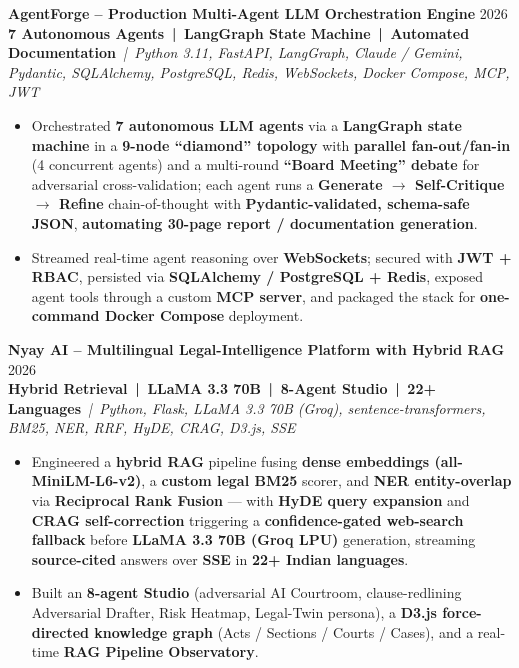\documentclass[a4paper,10pt]{article}
\newcommand{\projectEntry}[4]{%
  \vspace{1pt}%
  \noindent\textbf{\color{HeaderDark}#1} \hfill {\small\color{SubText}#2}\\[-4pt]%
  {\scriptsize\color{AccentTeal}\textbf{#3}} {\scriptsize\color{TechTag}\textit{\,|\, #4}}%
  \vspace{0pt}\par%
}
\begin{document}
\vspace{1pt}

\projectEntry{AgentForge -- Production Multi-Agent LLM Orchestration Engine}
  {2026}
  {7 Autonomous Agents \,|\, LangGraph State Machine \,|\, Automated Documentation}
  {Python 3.11, FastAPI, LangGraph, Claude / Gemini, Pydantic, SQLAlchemy, PostgreSQL, Redis, WebSockets, Docker Compose, MCP, JWT}

\begin{itemize}[leftmargin=14pt, itemsep=0pt, parsep=0pt, topsep=1pt, label={\color{BulletColor}\textbf{--}}]
  \item {\small Orchestrated \textbf{7 autonomous LLM agents} via a \textbf{LangGraph state machine} in a \textbf{9-node ``diamond'' topology} with \textbf{parallel fan-out/fan-in} (4 concurrent agents) and a multi-round \textbf{``Board Meeting'' debate} for adversarial cross-validation; each agent runs a \textbf{Generate $\rightarrow$ Self-Critique $\rightarrow$ Refine} chain-of-thought with \textbf{Pydantic-validated, schema-safe JSON}, \textbf{automating 30-page report / documentation generation}.}
  \item {\small Streamed real-time agent reasoning over \textbf{WebSockets}; secured with \textbf{JWT + RBAC}, persisted via \textbf{SQLAlchemy / PostgreSQL + Redis}, exposed agent tools through a custom \textbf{MCP server}, and packaged the stack for \textbf{one-command Docker Compose} deployment.}
\end{itemize}

\vspace{1pt}

\projectEntry{Nyay AI -- Multilingual Legal-Intelligence Platform with Hybrid RAG}
  {2026}
  {Hybrid Retrieval \,|\, LLaMA 3.3 70B \,|\, 8-Agent Studio \,|\, 22+ Languages}
  {Python, Flask, LLaMA 3.3 70B (Groq), sentence-transformers, BM25, NER, RRF, HyDE, CRAG, D3.js, SSE}

\begin{itemize}[leftmargin=14pt, itemsep=0pt, parsep=0pt, topsep=1pt, label={\color{BulletColor}\textbf{--}}]
  \item {\small Engineered a \textbf{hybrid RAG} pipeline fusing \textbf{dense embeddings (all-MiniLM-L6-v2)}, a \textbf{custom legal BM25} scorer, and \textbf{NER entity-overlap} via \textbf{Reciprocal Rank Fusion} --- with \textbf{HyDE query expansion} and \textbf{CRAG self-correction} triggering a \textbf{confidence-gated web-search fallback} before \textbf{LLaMA 3.3 70B (Groq LPU)} generation, streaming \textbf{source-cited} answers over \textbf{SSE} in \textbf{22+ Indian languages}.}
  \item {\small Built an \textbf{8-agent Studio} (adversarial AI Courtroom, clause-redlining Adversarial Drafter, Risk Heatmap, Legal-Twin persona), a \textbf{D3.js force-directed knowledge graph} (Acts / Sections / Courts / Cases), and a real-time \textbf{RAG Pipeline Observatory}.}
\end{itemize}
\end{document}
